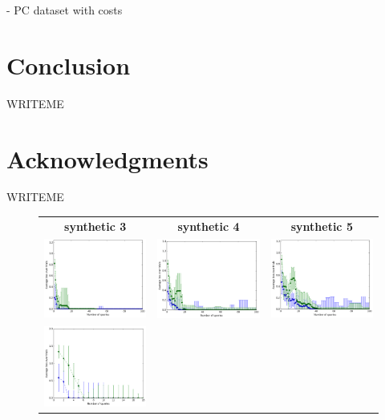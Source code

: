 \documentclass{article}
\renewcommand\[{\begin{equation}}
\renewcommand\]{\end{equation}}
\begin{document}
- PC dataset with costs

\section{Conclusion}

WRITEME

\section*{Acknowledgments}

WRITEME




\onecolumn

\begin{figure}[b]
    \centering
    \begin{tabular}{ccc}
        {\bf synthetic 3} & {\bf synthetic 4} & {\bf synthetic 5}
        \\
        \includegraphics[width=12em]{figures/synthetic_3_uniform} &
        \includegraphics[width=12em]{figures/synthetic_4_uniform} &
        \includegraphics[width=12em]{figures/synthetic_5_uniform}
        \\
        \includegraphics[width=12em]{figures/synthetic_3_uniform_sparse} &

\end{tabular}
\end{figure}
\end{document}
